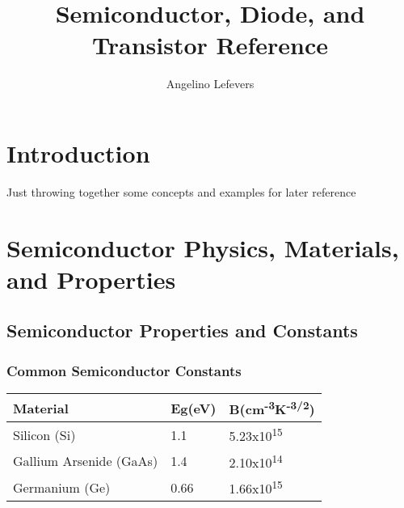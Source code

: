 \documentclass{article}
\begin{document}
\title{Semiconductor, Diode, and Transistor Reference}
\author{Angelino Lefevers}
\maketitle
\thispagestyle{empty}
\cleardoublepage
\tableofcontents
\thispagestyle{empty}
\cleardoublepage
\section*{Introduction}
Just throwing together some concepts and examples for later reference
\cleardoublepage
\section{Semiconductor Physics, Materials, and Properties}
\setcounter{page}{1}
\subsection{Semiconductor Properties and Constants}

\subsubsection{Common Semiconductor Constants}
\begin{center}
\begin{tabular}{|l|l|l|}
\hline
Material & Eg(eV) & B(cm\textsuperscript{-3}K\textsuperscript{-3/2}) \\
\hline
Silicon (Si) & 1.1 & 5.23x10\textsuperscript{15} \\
Gallium Arsenide (GaAs) & 1.4 & 2.10x10\textsuperscript{14} \\
Germanium (Ge) & 0.66 & 1.66x10\textsuperscript{15} \\
\hline
\end{tabular}
\end{center}
\end{document}
